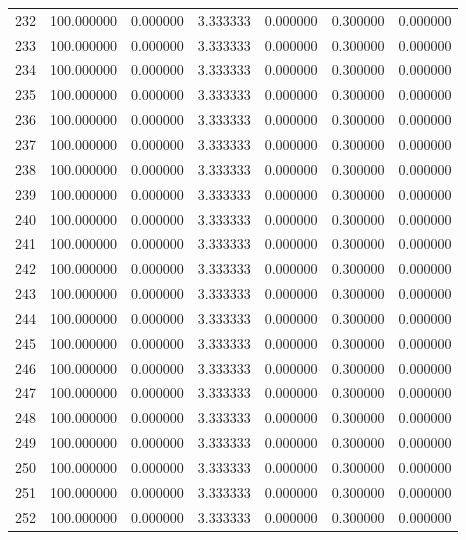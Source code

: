 \begin{tabular}{rrrrrrr}
232 & 100.000000 &    0.000000 &  3.333333 &   0.000000 &   0.300000 &  0.000000 \\
233 & 100.000000 &    0.000000 &  3.333333 &   0.000000 &   0.300000 &  0.000000 \\
234 & 100.000000 &    0.000000 &  3.333333 &   0.000000 &   0.300000 &  0.000000 \\
235 & 100.000000 &    0.000000 &  3.333333 &   0.000000 &   0.300000 &  0.000000 \\
236 & 100.000000 &    0.000000 &  3.333333 &   0.000000 &   0.300000 &  0.000000 \\
237 & 100.000000 &    0.000000 &  3.333333 &   0.000000 &   0.300000 &  0.000000 \\
238 & 100.000000 &    0.000000 &  3.333333 &   0.000000 &   0.300000 &  0.000000 \\
239 & 100.000000 &    0.000000 &  3.333333 &   0.000000 &   0.300000 &  0.000000 \\
240 & 100.000000 &    0.000000 &  3.333333 &   0.000000 &   0.300000 &  0.000000 \\
241 & 100.000000 &    0.000000 &  3.333333 &   0.000000 &   0.300000 &  0.000000 \\
242 & 100.000000 &    0.000000 &  3.333333 &   0.000000 &   0.300000 &  0.000000 \\
243 & 100.000000 &    0.000000 &  3.333333 &   0.000000 &   0.300000 &  0.000000 \\
244 & 100.000000 &    0.000000 &  3.333333 &   0.000000 &   0.300000 &  0.000000 \\
245 & 100.000000 &    0.000000 &  3.333333 &   0.000000 &   0.300000 &  0.000000 \\
246 & 100.000000 &    0.000000 &  3.333333 &   0.000000 &   0.300000 &  0.000000 \\
247 & 100.000000 &    0.000000 &  3.333333 &   0.000000 &   0.300000 &  0.000000 \\
248 & 100.000000 &    0.000000 &  3.333333 &   0.000000 &   0.300000 &  0.000000 \\
249 & 100.000000 &    0.000000 &  3.333333 &   0.000000 &   0.300000 &  0.000000 \\
250 & 100.000000 &    0.000000 &  3.333333 &   0.000000 &   0.300000 &  0.000000 \\
251 & 100.000000 &    0.000000 &  3.333333 &   0.000000 &   0.300000 &  0.000000 \\
252 & 100.000000 &    0.000000 &  3.333333 &   0.000000 &   0.300000 &  0.000000 \\

\end{tabular}
